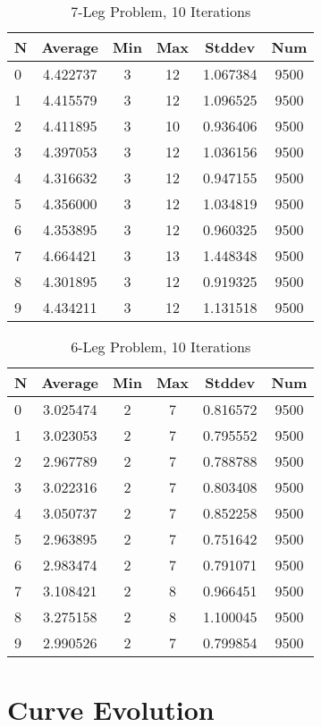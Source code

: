\documentclass{article}
\begin{document}
\begin{table}
\centering
\begin{tabular}{|l|c|c|c|c|c|}
\hline
N & Average & Min & Max & Stddev & Num \\
\hline
0 & 4.422737 & 3 & 12 & 1.067384 & 9500 \\ 
1 & 4.415579 & 3 & 12 & 1.096525 & 9500 \\ 
2 & 4.411895 & 3 & 10 & 0.936406 & 9500 \\ 
3 & 4.397053 & 3 & 12 & 1.036156 & 9500 \\ 
4 & 4.316632 & 3 & 12 & 0.947155 & 9500 \\ 
5 & 4.356000 & 3 & 12 & 1.034819 & 9500 \\ 
6 & 4.353895 & 3 & 12 & 0.960325 & 9500 \\ 
7 & 4.664421 & 3 & 13 & 1.448348 & 9500 \\ 
8 & 4.301895 & 3 & 12 & 0.919325 & 9500 \\ 
9 & 4.434211 & 3 & 12 & 1.131518 & 9500 \\
\hline
\end{tabular}
\caption{7-Leg Problem, 10 Iterations}
\label{tab:template}
\end{table}

\begin{table}
\centering
\begin{tabular}{|l|c|c|c|c|c|}
\hline
N & Average & Min & Max & Stddev & Num \\
\hline
0 & 3.025474 & 2 & 7 & 0.816572 & 9500 \\ 
1 & 3.023053 & 2 & 7 & 0.795552 & 9500 \\ 
2 & 2.967789 & 2 & 7 & 0.788788 & 9500 \\ 
3 & 3.022316 & 2 & 7 & 0.803408 & 9500 \\ 
4 & 3.050737 & 2 & 7 & 0.852258 & 9500 \\ 
5 & 2.963895 & 2 & 7 & 0.751642 & 9500 \\ 
6 & 2.983474 & 2 & 7 & 0.791071 & 9500 \\ 
7 & 3.108421 & 2 & 8 & 0.966451 & 9500 \\ 
8 & 3.275158 & 2 & 8 & 1.100045 & 9500 \\ 
9 & 2.990526 & 2 & 7 & 0.799854 & 9500 \\
\hline
\end{tabular}
\caption{6-Leg Problem, 10 Iterations}
\label{tab:template}
\end{table}

\clearpage
\section*{Curve Evolution}
\end{document}
